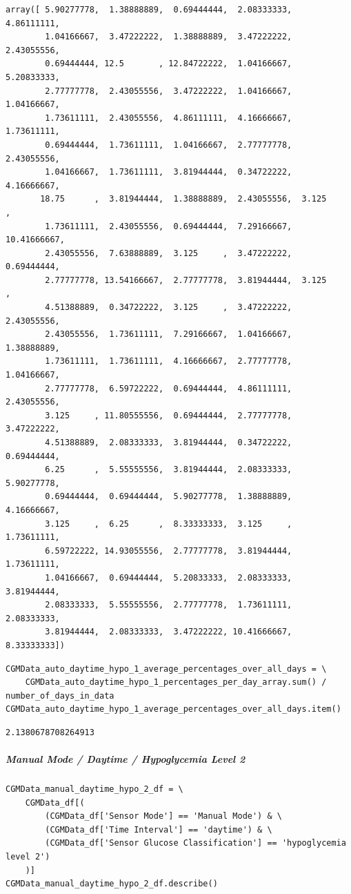 \begin{verbatim}
array([ 5.90277778,  1.38888889,  0.69444444,  2.08333333,  4.86111111,
        1.04166667,  3.47222222,  1.38888889,  3.47222222,  2.43055556,
        0.69444444, 12.5       , 12.84722222,  1.04166667,  5.20833333,
        2.77777778,  2.43055556,  3.47222222,  1.04166667,  1.04166667,
        1.73611111,  2.43055556,  4.86111111,  4.16666667,  1.73611111,
        0.69444444,  1.73611111,  1.04166667,  2.77777778,  2.43055556,
        1.04166667,  1.73611111,  3.81944444,  0.34722222,  4.16666667,
       18.75      ,  3.81944444,  1.38888889,  2.43055556,  3.125     ,
        1.73611111,  2.43055556,  0.69444444,  7.29166667, 10.41666667,
        2.43055556,  7.63888889,  3.125     ,  3.47222222,  0.69444444,
        2.77777778, 13.54166667,  2.77777778,  3.81944444,  3.125     ,
        4.51388889,  0.34722222,  3.125     ,  3.47222222,  2.43055556,
        2.43055556,  1.73611111,  7.29166667,  1.04166667,  1.38888889,
        1.73611111,  1.73611111,  4.16666667,  2.77777778,  1.04166667,
        2.77777778,  6.59722222,  0.69444444,  4.86111111,  2.43055556,
        3.125     , 11.80555556,  0.69444444,  2.77777778,  3.47222222,
        4.51388889,  2.08333333,  3.81944444,  0.34722222,  0.69444444,
        6.25      ,  5.55555556,  3.81944444,  2.08333333,  5.90277778,
        0.69444444,  0.69444444,  5.90277778,  1.38888889,  4.16666667,
        3.125     ,  6.25      ,  8.33333333,  3.125     ,  1.73611111,
        6.59722222, 14.93055556,  2.77777778,  3.81944444,  1.73611111,
        1.04166667,  0.69444444,  5.20833333,  2.08333333,  3.81944444,
        2.08333333,  5.55555556,  2.77777778,  1.73611111,  2.08333333,
        3.81944444,  2.08333333,  3.47222222, 10.41666667,  8.33333333])
\end{verbatim}

\begin{verbatim}
CGMData_auto_daytime_hypo_1_average_percentages_over_all_days = \
    CGMData_auto_daytime_hypo_1_percentages_per_day_array.sum() / number_of_days_in_data
CGMData_auto_daytime_hypo_1_average_percentages_over_all_days.item()
\end{verbatim}

\begin{verbatim}
2.1380678708264913
\end{verbatim}

\subparagraph{Manual Mode / Daytime / Hypoglycemia Level 2}

\begin{verbatim}
CGMData_manual_daytime_hypo_2_df = \
    CGMData_df[(
        (CGMData_df['Sensor Mode'] == 'Manual Mode') & \
        (CGMData_df['Time Interval'] == 'daytime') & \
        (CGMData_df['Sensor Glucose Classification'] == 'hypoglycemia level 2')
    )]
CGMData_manual_daytime_hypo_2_df.describe()
\end{verbatim}

